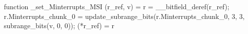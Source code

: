 function _set_Minterrupts_MSI (r_ref, v) = {
    r = __bitfield_deref(r_ref);
    r.Minterrupts_chunk_0 = update_subrange_bits(r.Minterrupts_chunk_0, 3, 3, subrange_bits(v, 0, 0));
    (*r_ref) = r
}
